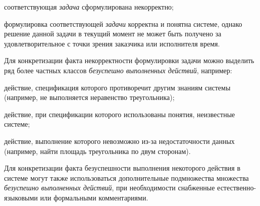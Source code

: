 \begin{SCn}
\begin{scnsubstruct}
\begin{scnindent}
\begin{scneqtoset}
\begin{scnindent}
\begin{scnsubdividing}
\begin{scnindent}
{			                            \begin{scnitemize}
			                                \item соответствующая \textit{задача} сформулирована некорректно;
			                                \item формулировка соответствующей \textit{задачи} корректна и понятна системе, однако решение данной задачи в текущий момент не может быть получено за удовлетворительное с точки зрения заказчика или исполнителя время.
			                            \end{scnitemize}
			                            Для конкретизации факта некорректности формулировки задачи можно выделить ряд более частных классов \textit{безуспешно выполненных действий}, например:
			                            \begin{scnitemize}
			                                \item действие, спецификация которого противоречит другим знаниям системы (например, не выполняется неравенство треугольника);
			                                \item действие, при спецификации которого использованы понятия, неизвестные системе;
			                                \item действие, выполнение которого невозможно из-за недостаточности данных (например, найти площадь треугольника по двум сторонам).
			                            \end{scnitemize}
			                            Для конкретизации факта безуспешности выполнения некоторого действия в системе могут также использоваться дополнительные подмножества множества \textit{безуспешно выполненных действий}, при необходимости снабженные естественно-языковыми или формальными комментариями.}
			                        \begin{scnindent}
			                        \end{scnindent}
			                  \end{scnindent}

\end{scnsubdividing}
\end{scnindent}
\end{scneqtoset}
\end{scnindent}
\end{scnsubstruct}
\end{SCn}
